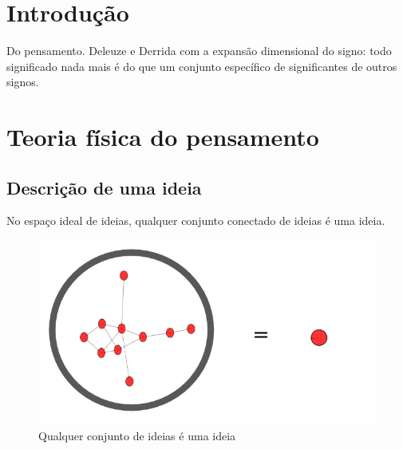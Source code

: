 \documentclass[a4paper,12pt,titlepage]{article}
\begin{document}
\section{Introdução}
Do pensamento. Deleuze e Derrida com a expansão dimensional do signo:
todo significado nada mais é do que um conjunto específico de significantes
de outros signos.


\section{Teoria física do pensamento}
\subsection{Descrição de uma ideia}
No espaço ideal de ideias, qualquer conjunto conectado
de ideias é uma ideia.

\begin{figure}[h!]
    \begin{center}
        \includegraphics[scale=.3]{figs/variasUma.png}
        \caption{Qualquer conjunto de ideias é uma ideia}
        \label{fig:face}
    \end{center}
\end{figure}
\end{document}
